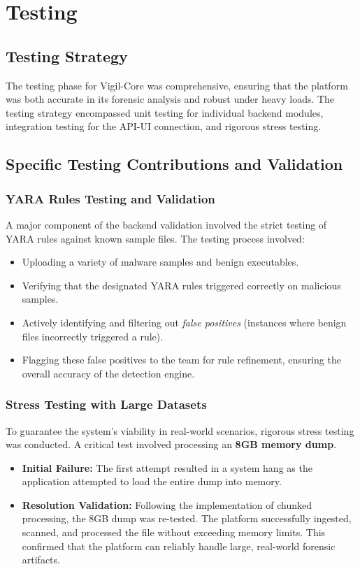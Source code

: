 \chapter{Testing}

\section{Testing Strategy}
The testing phase for Vigil-Core was comprehensive, ensuring that the platform was both accurate in its forensic analysis and robust under heavy loads. The testing strategy encompassed unit testing for individual backend modules, integration testing for the API-UI connection, and rigorous stress testing.

\section{Specific Testing Contributions and Validation}

\subsection{YARA Rules Testing and Validation}
A major component of the backend validation involved the strict testing of YARA rules against known sample files. The testing process involved:
\begin{itemize}
    \item Uploading a variety of malware samples and benign executables.
    \item Verifying that the designated YARA rules triggered correctly on malicious samples.
    \item Actively identifying and filtering out \textit{false positives} (instances where benign files incorrectly triggered a rule).
    \item Flagging these false positives to the team for rule refinement, ensuring the overall accuracy of the detection engine.
\end{itemize}

\subsection{Stress Testing with Large Datasets}
To guarantee the system's viability in real-world scenarios, rigorous stress testing was conducted. A critical test involved processing an \textbf{8GB memory dump}. 
\begin{itemize}
    \item \textbf{Initial Failure:} The first attempt resulted in a system hang as the application attempted to load the entire dump into memory.
    \item \textbf{Resolution Validation:} Following the implementation of chunked processing, the 8GB dump was re-tested. The platform successfully ingested, scanned, and processed the file without exceeding memory limits. This confirmed that the platform can reliably handle large, real-world forensic artifacts.
\end{itemize}

